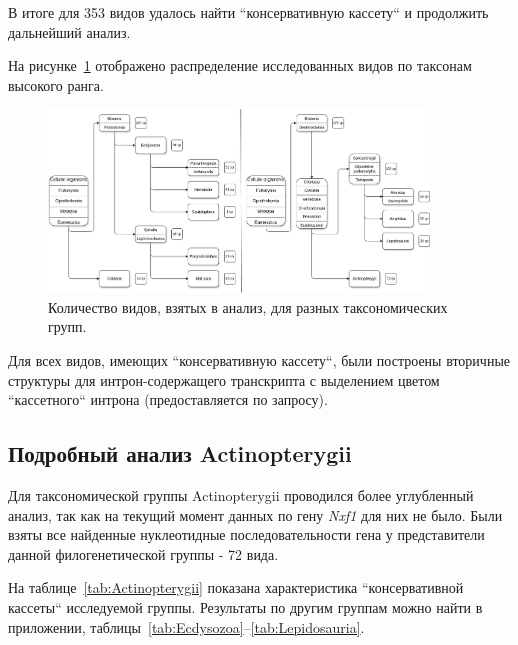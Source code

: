 В итоге для 353 видов удалось найти ``консервативную кассету`` и продолжить дальнейший анализ.


На рисунке~\ref{fig:tree_summary} отображено распределение исследованных видов по таксонам высокого ранга.

\begin{figure}[h] %
    \centering
    \includegraphics[width=0.9\textwidth]{images/Tree_summary}
    \caption{Количество видов, взятых в анализ, для разных таксономических групп.}
    \label{fig:tree_summary}
\end{figure}

Для всех видов, имеющих ``консервативную кассету``, были построены вторичные структуры для интрон-содержащего транскрипта с выделением цветом ``кассетного`` интрона (предоставляется по запросу).


\subsection{Подробный анализ Actinopterygii}

Для таксономической группы Actinopterygii проводился более углубленный анализ, так как на текущий момент данных по гену \textit{Nxf1} для них не было.
Были взяты все найденные нуклеотидные последовательности гена у представители данной филогенетической группы - 72 вида.


На таблице~\ref{tab:Actinopterygii} показана характеристика ``консервативной кассеты`` исследуемой группы.
Результаты по другим группам можно найти в приложении, таблицы~\ref{tab:Ecdysozoa}--\ref{tab:Lepidosauria}.

